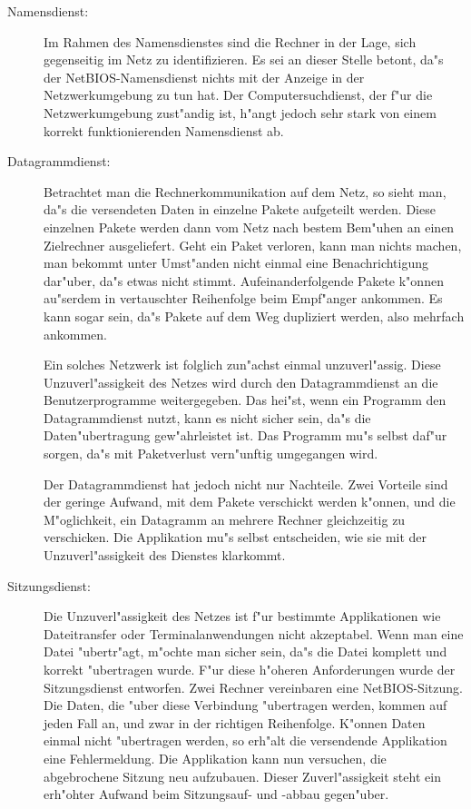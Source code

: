 \documentclass{scrartcl}\usepackage{pslatex}\typearea{12}
\begin{document}
\begin{description}
  
\item[Namensdienst:] Im Rahmen des Namensdienstes sind die Rechner in
  der Lage, sich gegenseitig im Netz zu identifizieren. Es sei an
  dieser Stelle betont, da"s der NetBIOS-Namensdienst nichts mit der
  Anzeige in der Netzwerkumgebung zu tun hat. Der Computersuchdienst,
  der f"ur die Netzwerkumgebung zust"andig ist, h"angt jedoch sehr
  stark von einem korrekt funktionierenden Namensdienst ab.
  
\item[Datagrammdienst:] Betrachtet man die Rechnerkommunikation auf
  dem Netz, so sieht man, da"s die versendeten Daten in einzelne
  Pakete aufgeteilt werden. Diese einzelnen Pakete werden dann vom
  Netz nach bestem Bem"uhen an einen Zielrechner ausgeliefert. Geht
  ein Paket verloren, kann man nichts machen, man bekommt unter
  Umst"anden nicht einmal eine Benachrichtigung dar"uber, da"s etwas
  nicht stimmt. Aufeinanderfolgende Pakete k"onnen au"serdem in
  vertauschter Reihenfolge beim Empf"anger ankommen. Es kann sogar
  sein, da"s Pakete auf dem Weg dupliziert werden, also mehrfach
  ankommen.
  
  Ein solches Netzwerk ist folglich zun"achst einmal unzuverl"assig.
  Diese Unzuverl"assigkeit des Netzes wird durch den Datagrammdienst
  an die Benutzerprogramme weitergegeben. Das hei"st, wenn ein
  Programm den Datagrammdienst nutzt, kann es nicht sicher sein, da"s
  die Daten"ubertragung gew"ahrleistet ist. Das Programm mu"s selbst
  daf"ur sorgen, da"s mit Paketverlust vern"unftig umgegangen wird.
  
  Der Datagrammdienst hat jedoch nicht nur Nachteile.  Zwei Vorteile
  sind der geringe Aufwand, mit dem Pakete verschickt werden k"onnen,
  und die M"oglichkeit, ein Datagramm an mehrere Rechner gleichzeitig
  zu verschicken. Die Applikation mu"s selbst entscheiden, wie sie mit
  der Unzuverl"assigkeit des Dienstes klarkommt.
  
\item[Sitzungsdienst:] Die Unzuverl"assigkeit des Netzes ist f"ur
  bestimmte Applikationen wie Dateitransfer oder Terminalanwendungen
  nicht akzeptabel. Wenn man eine Datei "ubertr"agt, m"ochte man
  sicher sein, da"s die Datei komplett und korrekt "ubertragen wurde.
  F"ur diese h"oheren Anforderungen wurde der Sitzungsdienst
  entworfen. Zwei Rechner vereinbaren eine NetBIOS-Sitzung. Die Daten,
  die "uber diese Verbindung "ubertragen werden, kommen auf jeden Fall
  an, und zwar in der richtigen Reihenfolge. K"onnen Daten einmal
  nicht "ubertragen werden, so erh"alt die versendende Applikation
  eine Fehlermeldung. Die Applikation kann nun versuchen, die
  abgebrochene Sitzung neu aufzubauen. Dieser Zuverl"assigkeit steht
  ein erh"ohter Aufwand beim Sitzungsauf- und -abbau gegen"uber.

\end{description}
\end{document}
